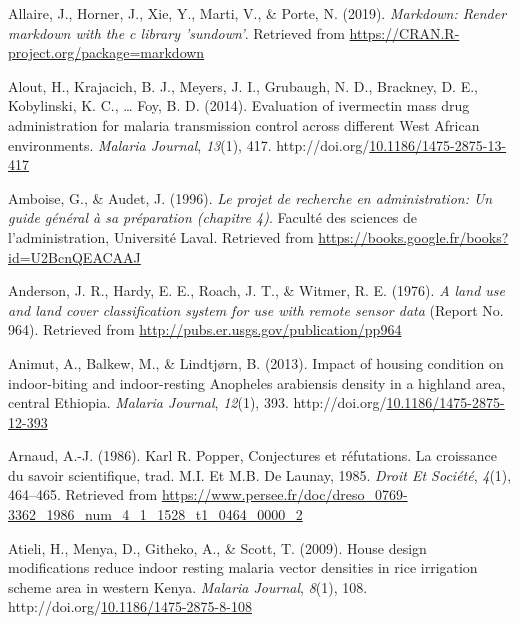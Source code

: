 \documentclass[12pt,twoside]{reedthesis}
\newlength{\cslhangindent}
\newenvironment{CSLReferences}[2] %
 {%
  \setlength{\parindent}{0pt}
  \ifodd #1 \everypar{\setlength{\hangindent}{\cslhangindent}}\ignorespaces\fi
  \ifnum #2 > 0
  \setlength{\parskip}{#2\baselineskip}
  \fi
 }%
 {}
\begin{document}
\hypertarget{refs}{}
\begin{CSLReferences}{1}{0}
\leavevmode{}%
Allaire, J., Horner, J., Xie, Y., Marti, V., \& Porte, N. (2019). \emph{Markdown: Render markdown with the c library 'sundown'}. Retrieved from \url{https://CRAN.R-project.org/package=markdown}

\leavevmode{}%
Alout, H., Krajacich, B. J., Meyers, J. I., Grubaugh, N. D., Brackney, D. E., Kobylinski, K. C., \ldots{} Foy, B. D. (2014). Evaluation of ivermectin mass drug administration for malaria transmission control across different {West} {African} environments. \emph{Malaria Journal}, \emph{13}(1), 417. http://doi.org/\href{https://doi.org/10.1186/1475-2875-13-417}{10.1186/1475-2875-13-417}

\leavevmode{}%
Amboise, G., \& Audet, J. (1996). \emph{Le projet de recherche en administration: Un guide général à sa préparation (chapitre 4)}. Faculté des sciences de l'administration, Université Laval. Retrieved from \url{https://books.google.fr/books?id=U2BcnQEACAAJ}

\leavevmode{}%
Anderson, J. R., Hardy, E. E., Roach, J. T., \& Witmer, R. E. (1976). \emph{A land use and land cover classification system for use with remote sensor data} (Report No. 964). Retrieved from \url{http://pubs.er.usgs.gov/publication/pp964}

\leavevmode{}%
Animut, A., Balkew, M., \& Lindtjørn, B. (2013). Impact of housing condition on indoor-biting and indoor-resting {Anopheles} arabiensis density in a highland area, central {Ethiopia}. \emph{Malaria Journal}, \emph{12}(1), 393. http://doi.org/\href{https://doi.org/10.1186/1475-2875-12-393}{10.1186/1475-2875-12-393}

\leavevmode{}%
Arnaud, A.-J. (1986). Karl {R}. {Popper}, {Conjectures} et réfutations. {La} croissance du savoir scientifique, trad. {M}.{I}. Et {M}.{B}. De {Launay}, 1985. \emph{Droit Et Société}, \emph{4}(1), 464--465. Retrieved from \url{https://www.persee.fr/doc/dreso_0769-3362_1986_num_4_1_1528_t1_0464_0000_2}

\leavevmode{}%
Atieli, H., Menya, D., Githeko, A., \& Scott, T. (2009). House design modifications reduce indoor resting malaria vector densities in rice irrigation scheme area in western {Kenya}. \emph{Malaria Journal}, \emph{8}(1), 108. http://doi.org/\href{https://doi.org/10.1186/1475-2875-8-108}{10.1186/1475-2875-8-108}


\end{CSLReferences}
\end{document}
